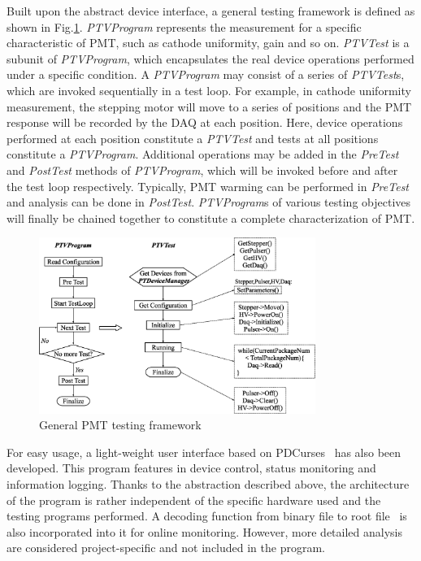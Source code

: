 \documentclass[review, times]{elsarticle}
\begin{document}
Built upon the abstract device interface, a general testing framework is defined as shown in Fig.\ref{fig:software_framework}.
\textit{PTVProgram} represents the measurement for a specific characteristic of PMT, such as cathode uniformity, gain and so on.
\textit{PTVTest} is a subunit of \textit{PTVProgram}, which encapsulates the real device operations performed under a specific condition.
A \textit{PTVProgram} may consist of a series of \textit{PTVTest}s, which are invoked sequentially in a test loop.
For example, in cathode uniformity measurement, the stepping motor will move to a series of positions and the PMT response will be recorded by the DAQ at each position.
Here, device operations performed at each position constitute a \textit{PTVTest} and tests at all positions constitute a \textit{PTVProgram}.
Additional operations may be added in the \textit{PreTest} and \textit{PostTest} methods of \textit{PTVProgram}, which will be invoked before and after the test loop respectively.
Typically, PMT warming can be performed in \textit{PreTest} and analysis can be done in \textit{PostTest}.
\textit{PTVProgram}s of various testing objectives will finally be chained together to constitute a complete characterization of PMT.

\begin{figure}
  \centering
 \includegraphics[width=90mm]{software_framework}
\caption{General PMT testing framework}
\label{fig:software_framework}
\end{figure}

For easy usage, a light-weight user interface based on PDCurses~\cite{pdcurses} has also been developed.
This program features in device control, status monitoring and information logging.
Thanks to the abstraction described above, the architecture of the program is rather independent of the specific hardware used and the testing programs performed.
A decoding function from binary file to root file~\cite{root} is also incorporated into it for online monitoring.
However, more detailed analysis are considered project-specific and not included in the program. 
\end{document}
